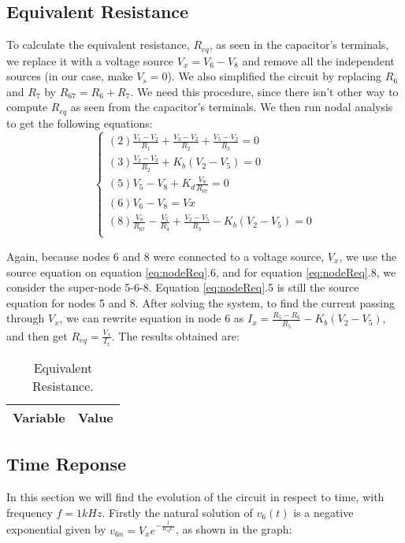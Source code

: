 \subsection{Equivalent Resistance}
\label{subsec:Req}
To calculate the equivalent resistance, $R_{eq}$, as seen in the capacitor's terminals, we replace it with a voltage source $V_x=V_6-V_8$ and remove all the independent sources (in our case, make $V_s=0$). We also simplified the circuit by replacing $R_6$ and $R_7$ by $R_{67}=R_6+R_7$. We need this procedure, since there isn't other way to compute $R_{eq}$ as seen from the capacitor's terminals. We then run nodal analysis to get the following equations:
\begin{equation}\label{eq:nodeReq}
\begin{cases}
  (2) \frac{V_1 - V_2}{R_1} + \frac{V_3 - V_2}{R_2} + \frac{V_5 - V_2}{R_3} = 0 \\
  (3) \frac{V_2 - V_3}{R_2} + K_b(V_2 - V_5) = 0 \\
  (5) V_5 - V_8 + K_d\frac{V_8}{R_{67}} = 0 \\
  (6) V_6 - V_8 = Vx \\
  (8) \frac{V_8}{R_{67}} - \frac{V_5}{R_4} + \frac{V_2 - V_5}{R_3} - K_b(V_2-V_5)= 0 \\
\end{cases}
\end{equation}

Again, because nodes 6 and 8 were connected to a voltage source, $V_x$, we use the source equation on equation \ref{eq:nodeReq}.6, and for equation \ref{eq:nodeReq}.8, we consider the super-node 5-6-8. Equation \ref{eq:nodeReq}.5 is still the source equation for nodes 5 and 8.
After solving the system, to find the current passing through $V_x$, we can rewrite equation in node 6 as $I_x= \frac{R_5 - R_6}{R_5} - K_b(V_2 - V_5)$, and then get $R_{eq}=\frac{V_x}{I_x}$.
The results obtained are:

\begin{table}[H]
  \centering
  \begin{tabular}{|l|r|}
    \hline
        {\bf Variable} & {\bf Value} \\ \hline
        
  \end{tabular}
  \caption{Equivalent Resistance.}
  \label{tab:mesh}
\end{table}


\subsection{Time Reponse}
In this section we will find the evolution of the circuit in respect to time, with frequency $f= 1kHz$.
Firstly the natural solution of $v_6(t)$ is a negative exponential given by $v_{6n}=V_xe^{-\frac{t}{R_{eq}C}}$, as shown in the graph:

